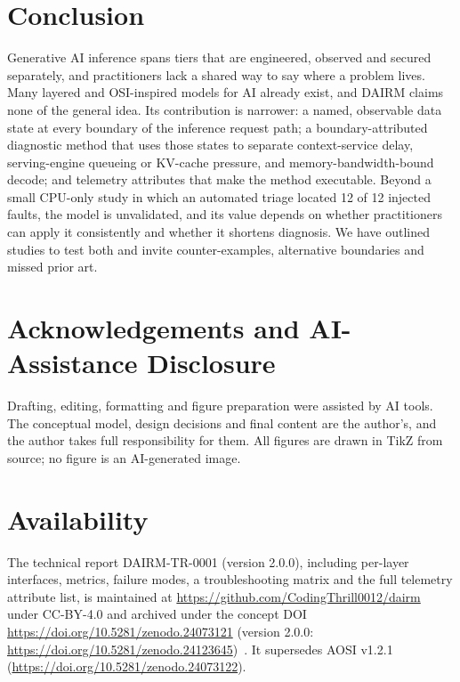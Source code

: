 \documentclass[11pt]{article}
\begin{document}
\section{Conclusion}
\label{sec:conclusion}
Generative AI inference spans tiers that are engineered, observed and secured separately, and practitioners lack a shared way to say where a problem lives. Many layered and OSI-inspired models for AI already exist, and DAIRM claims none of the general idea. Its contribution is narrower: a named, observable data state at every boundary of the inference request path; a boundary-attributed diagnostic method that uses those states to separate context-service delay, serving-engine queueing or KV-cache pressure, and memory-bandwidth-bound decode; and telemetry attributes that make the method executable. Beyond a small CPU-only study in which an automated triage located 12 of 12 injected faults, the model is unvalidated, and its value depends on whether practitioners can apply it consistently and whether it shortens diagnosis. We have outlined studies to test both and invite counter-examples, alternative boundaries and missed prior art.

\section*{Acknowledgements and AI-Assistance Disclosure}
Drafting, editing, formatting and figure preparation were assisted by AI tools. The conceptual model, design decisions and final content are the author's, and the author takes full responsibility for them. All figures are drawn in TikZ from source; no figure is an AI-generated image.

\section*{Availability}
The technical report DAIRM-TR-0001 (version 2.0.0), including per-layer interfaces, metrics, failure modes, a troubleshooting matrix and the full telemetry attribute list, is maintained at \url{https://github.com/CodingThrill0012/dairm} under CC-BY-4.0 and archived under the concept DOI \url{https://doi.org/10.5281/zenodo.24073121} (version 2.0.0: \url{https://doi.org/10.5281/zenodo.24123645})~\cite{bhatt2026dairm}. It supersedes AOSI v1.2.1 (\url{https://doi.org/10.5281/zenodo.24073122}).

{\footnotesize\setlength{\bibsep}{1pt}

}
\end{document}
